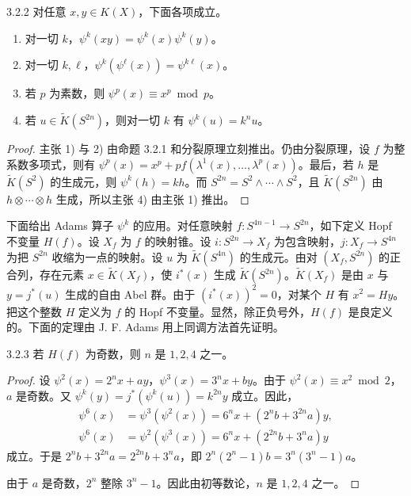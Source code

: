 \begin{proposition*}{3.2.2}
对任意 $x,y\in K(X)$，下面各项成立。
\begin{enumerate}[label=\arabic*),leftmargin=2.2em,itemsep=2pt]
\item 对一切 $k$，$\psi^k(xy)=\psi^k(x)\psi^k(y)$。
\item 对一切 $k,\ell$，$\psi^k(\psi^\ell(x))=\psi^{k\ell}(x)$。
\item 若 $p$ 为素数，则 $\psi^p(x)\equiv x^p \bmod p$。
\item 若 $u\in\tilde K(S^{2n})$，则对一切 $k$ 有 $\psi^k(u)=k^nu$。
\end{enumerate}
\end{proposition*}

\begin{proof}
主张 1) 与 2) 由命题 3.2.1 和分裂原理立刻推出。仍由分裂原理，设 $f$ 为整系数多项式，则有 $\psi^p(x)=x^p+pf(\lambda^1(x),\dots,\lambda^p(x))$。最后，若 $h$ 是 $\tilde K(S^2)$ 的生成元，则 $\psi^k(h)=kh$。而 $S^{2n}=S^2\wedge\cdots\wedge S^2$，且 $\tilde K(S^{2n})$ 由 $h\otimes\cdots\otimes h$ 生成，所以主张 4) 由主张 1) 推出。
\end{proof}

下面给出 Adams 算子 $\psi^k$ 的应用。对任意映射 $f\colon S^{4n-1}\to S^{2n}$，如下定义 Hopf 不变量 $H(f)$。设 $X_f$ 为 $f$ 的映射锥。设 $i\colon S^{2n}\to X_f$ 为包含映射，$j\colon X_f\to S^{4n}$ 为把 $S^{2n}$ 收缩为一点的映射。设 $u$ 为 $\tilde K(S^{4n})$ 的生成元。由对 $(X_f,S^{2n})$ 的正合列，存在元素 $x\in\tilde K(X_f)$，使 $i^*(x)$ 生成 $\tilde K(S^{2n})$。$\tilde K(X_f)$ 是由 $x$ 与 $y=j^*(u)$ 生成的自由 Abel 群。由于 $(i^*(x))^2=0$，对某个 $H$ 有 $x^2=Hy$。把这个整数 $H$ 定义为 $f$ 的 Hopf 不变量。显然，除正负号外，$H(f)$ 是良定义的。下面的定理由 J. F. Adams 用上同调方法首先证明。


\begin{theorem*}{3.2.3}
若 $H(f)$ 为奇数，则 $n$ 是 $1,2,4$ 之一。
\end{theorem*}

\begin{proof}
设 $\psi^2(x)=2^nx+ay$，$\psi^3(x)=3^nx+by$。由于 $\psi^2(x)\equiv x^2\bmod 2$，$a$ 是奇数。又 $\psi^k(y)=j^*(\psi^k(u))=k^{2n}y$ 成立。因此，
\begin{align*}
\psi^6(x)&=\psi^3(\psi^2(x))=6^nx+(2^nb+3^{2n}a)y,\\
\psi^6(x)&=\psi^2(\psi^3(x))=6^nx+(2^{2n}b+3^na)y
\end{align*}
成立。于是 $2^nb+3^{2n}a=2^{2n}b+3^na$，即 $2^n(2^n-1)b=3^n(3^n-1)a$。

由于 $a$ 是奇数，$2^n$ 整除 $3^n-1$。因此由初等数论，$n$ 是 $1,2,4$ 之一。
\end{proof}

